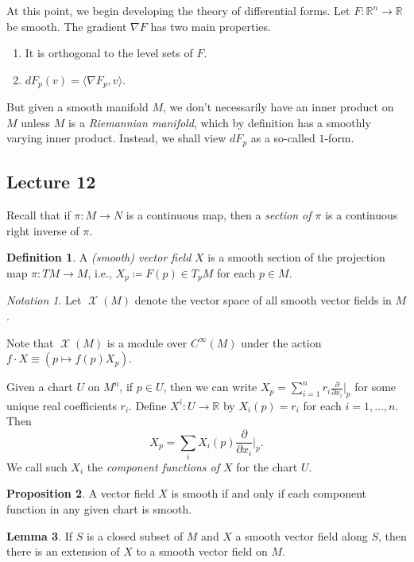 \documentclass[10pt,letterpaper,cm]{nupset}
\theoremstyle{definition}
\newtheorem{definition}{Definition}[subsection]
\theoremstyle{theorem}
\newtheorem{lemma}[definition]{Lemma}
\newtheorem{prop}[definition]{Proposition}
\theoremstyle{remark}
\newtheorem*{notation}{Notation}
\newcommand{\R}{\mathbb R}
\newcommand{\1}{\mathbf{1}}
\newcommand{\0}{\vec 0}
\DeclareMathOperator{\vf}{\mathscr{X}}
\begin{document}
At this point, we begin developing the theory of differential forms. Let $F: \R^n \to \R$ be smooth. The gradient $\nabla F$ has two main properties.
\begin{enumerate}
\item It is orthogonal to the level sets of $F$.
\item $dF_p(v) = \langle \nabla F_p, v\rangle$.
\end{enumerate}
But given a smooth manifold $M$, we don't necessarily have an inner product on $M$ unless $M$ is a \textit{Riemannian manifold}, which by definition has a smoothly varying inner product.  Instead, we shall view $dF_p$ as a so-called $1$-form.


\subsection{Lecture 12}


Recall that if $\pi : M \to N$ is a continuous map, then a \textit{section of $\pi$} is a continuous right inverse of $\pi$.


\begin{definition}
A \textit{(smooth) vector field} $X$ is a smooth section of the projection map $\pi : TM \to M$, i.e., $X_p\coloneqq  F(p) \in T_pM$ for each $p \in M$. 
\end{definition}


\begin{notation}
Let $\vf(M)$ denote the vector space of all smooth vector fields in $M$.
\end{notation}
Note that $\vf(M)$ is a module over $C^{\infty}(M)$ under the action $f \cdot X \equiv \left(p \mapsto f(p)X_p\right)$.

\medskip


Given a chart $U$ on $M^n$, if $p\in U$, then we can write $X_p = \sum_{i=1}^n r_i \frac{\partial}{\partial x_i}\bigr\rvert_p$ for some unique real coefficients $r_i$. Define $X^i : U \to \R$ by $X_i(p) = r_i$ for each $i=1, \ldots, n$. Then $$X_p = \sum_i X_i(p) \frac{\partial}{\partial x_i}\bigr\rvert_p.$$
We call such $X_i$ the \textit{component functions of $X$} for the chart $U$.


\begin{prop}
A vector field $X$ is smooth if and only if each component function in any given chart is smooth.
\end{prop}


\begin{lemma}
If $S$ is a closed subset of $M$ and $X$ a smooth vector field along $S$, then there is an extension of $X$ to a smooth vector field on $M$.
\end{lemma}
\end{document}
